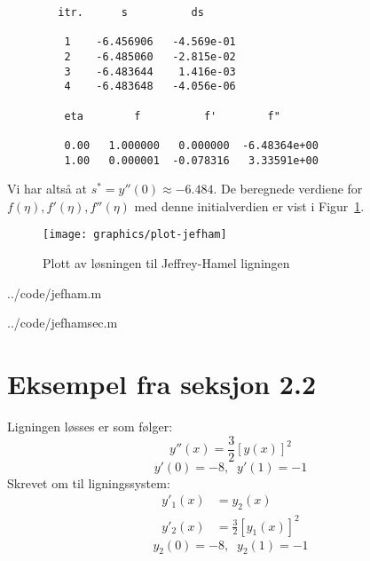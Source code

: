 \begin{programoutput}
\begin{verbatim}
        itr.      s          ds

         1    -6.456906   -4.569e-01
         2    -6.485060   -2.815e-02
         3    -6.483644    1.416e-03
         4    -6.483648   -4.056e-06

         eta        f          f'        f"

         0.00   1.000000   0.000000  -6.48364e+00
         1.00   0.000001  -0.078316   3.33591e+00
\end{verbatim}
\end{programoutput}
Vi har altså at $s^* = y''(0) \approx -6.484$. De beregnede verdiene for $f(\eta), f'(\eta), f''(\eta)$ med denne initialverdien er vist i Figur~\ref{fig:jefham}.

\clearpage

\begin{figure}[htbp]
  \centering
  \texttt{[image: graphics/plot-jefham]}
  \caption{Plott av løsningen til Jeffrey-Hamel ligningen}
  \label{fig:jefham}
\end{figure}


  {../code/jefham.m}


  {../code/jefhamsec.m}



\clearpage
\section{Eksempel fra seksjon 2.2} %
\label{sec:eksempel_fra_seksjon_2_2}
Ligningen løsses er som følger:
\begin{equation}
  y''(x) = \frac{3}{2} \left[ y(x) \right]^2
\end{equation}
\begin{equation}
  \tag{b}
  y'(0) = -8, \;\; y'(1) = -1
\end{equation}
Skrevet om til ligningssystem:
\begin{subequations}
\begin{align}
  y'_1(x) &= y_2(x) \\
  y'_2(x) &= \frac{3}{2} \left[ y_1(x) \right]^2
\end{align}
\end{subequations}
\begin{equation}
  \tag{b}
  y_2(0) = -8, \;\; y_2(1) = -1
\end{equation}

